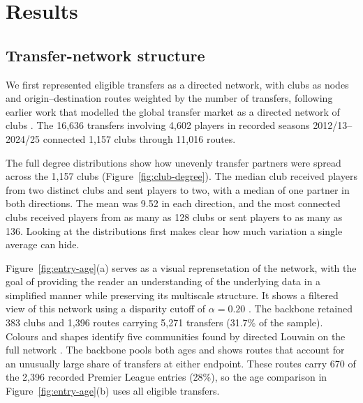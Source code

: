 \section*{Results}

\subsection*{Transfer-network structure}

We first represented eligible transfers as a directed network, with clubs as nodes and origin--destination routes weighted by the number of transfers, following earlier work that modelled the global transfer market as a directed network of clubs \cite{liu2016transfer}. The 16,636 transfers involving 4,602 players in recorded seasons 2012/13--2024/25 connected 1,157 clubs through 11,016 routes.

The full degree distributions show how unevenly transfer partners were spread across the 1,157 clubs (Figure~\ref{fig:club-degree}). The median club received players from two distinct clubs and sent players to two, with a median of one partner in both directions. The mean was 9.52 in each direction, and the most connected clubs received players from as many as 128 clubs or sent players to as many as 136. Looking at the distributions first makes clear how much variation a single average can hide. 

Figure~\ref{fig:entry-age}(a) serves as a visual reprensetation of the network, with the goal of providing the reader an understanding of the underlying data in a simplified manner while preserving its multiscale structure. It shows a filtered view of this network using a disparity cutoff of $\alpha = 0.20$ \cite{serrano2009multiscale}. The backbone retained 383 clubs and 1,396 routes carrying 5,271 transfers (31.7\% of the sample). Colours and shapes identify five communities found by directed Louvain on the full network \cite{blondel2008louvain,dugue2015directed}. The backbone pools both ages and shows routes that account for an unusually large share of transfers at either endpoint. These routes carry 670 of the 2,396 recorded Premier League entries (28\%), so the age comparison in Figure~\ref{fig:entry-age}(b) uses all eligible transfers.


